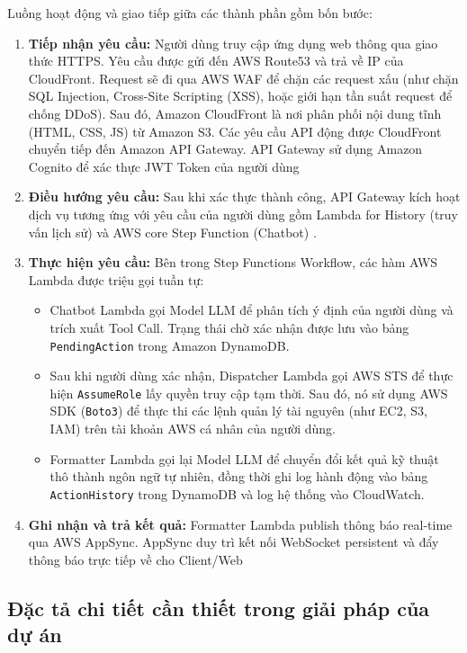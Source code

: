 \documentclass[a4paper,12pt]{article}
\begin{document}
Luồng hoạt động và giao tiếp giữa các thành phần gồm bốn bước:
\begin{enumerate}[itemsep=3pt,topsep=2pt]
  \item \textbf{Tiếp nhận yêu cầu:} Người dùng truy cập ứng dụng web thông qua giao thức HTTPS. Yêu cầu được gửi đến AWS Route53 và trả về IP của CloudFront. Request sẽ đi qua AWS WAF để chặn các request xấu (như chặn SQL Injection, Cross-Site Scripting (XSS), hoặc giới hạn tần suất request để chống DDoS). Sau đó, Amazon CloudFront là nơi phân phối nội dung tĩnh (HTML, CSS, JS) từ Amazon S3. Các yêu cầu API động được CloudFront chuyển tiếp đến Amazon API Gateway. API Gateway sử dụng Amazon Cognito để xác thực JWT Token của người dùng

  \item \textbf{Điều hướng yêu cầu:} Sau khi xác thực thành công, API Gateway kích hoạt dịch vụ tương ứng với yêu cầu của người dùng gồm Lambda for History (truy vấn lịch sử) và AWS core Step Function (Chatbot) .

  \item \textbf{Thực hiện yêu cầu:} Bên trong Step Functions Workflow, các hàm AWS Lambda được triệu gọi tuần tự:
\begin{itemize}
    \item Chatbot Lambda gọi Model LLM để phân tích ý định của người dùng và trích xuất Tool Call. Trạng thái chờ xác nhận được lưu vào bảng \texttt{PendingAction} trong Amazon DynamoDB.
    \item Sau khi người dùng xác nhận, Dispatcher Lambda gọi AWS STS để thực hiện \texttt{AssumeRole} lấy quyền truy cập tạm thời. Sau đó, nó sử dụng AWS SDK (\texttt{Boto3}) để thực thi các lệnh quản lý tài nguyên (như EC2, S3, IAM) trên tài khoản AWS cá nhân của người dùng.
    \item Formatter Lambda gọi lại Model LLM để chuyển đổi kết quả kỹ thuật thô thành ngôn ngữ tự nhiên, đồng thời ghi log hành động vào bảng \texttt{ActionHistory} trong DynamoDB và log hệ thống vào CloudWatch.
\end{itemize}

  \item \textbf{Ghi nhận và trả kết quả:} Formatter Lambda publish thông báo real-time qua AWS AppSync. AppSync duy trì kết nối WebSocket persistent và đẩy thông báo trực tiếp về cho Client/Web
\end{enumerate}

\subsection{Đặc tả chi tiết cần thiết trong giải pháp của dự án}
\end{document}
